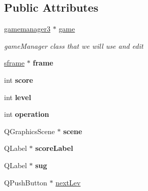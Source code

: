 \subsection*{\-Public \-Attributes}
\begin{DoxyCompactItemize}
\item 
\hypertarget{classnextwindow_a5781f299818d0b3fb7ec64cf98833f51}{\hyperlink{classgamemanager3}{gamemanager3} $\ast$ \hyperlink{classnextwindow_a5781f299818d0b3fb7ec64cf98833f51}{game}}\label{classnextwindow_a5781f299818d0b3fb7ec64cf98833f51}

\begin{DoxyCompactList}\small\item\em game\-Manager class that we will use and edit \end{DoxyCompactList}\item 
\hypertarget{classnextwindow_ad00acc8e6304a93f025ed6e820af23b3}{\hyperlink{classsframe}{sframe} $\ast$ {\bfseries frame}}\label{classnextwindow_ad00acc8e6304a93f025ed6e820af23b3}

\item 
\hypertarget{classnextwindow_a489f749224efac4e971e6a8840b73e66}{int {\bfseries score}}\label{classnextwindow_a489f749224efac4e971e6a8840b73e66}

\item 
\hypertarget{classnextwindow_a90b3d218995df6f53f4a3a87f394f773}{int {\bfseries level}}\label{classnextwindow_a90b3d218995df6f53f4a3a87f394f773}

\item 
\hypertarget{classnextwindow_a43a38e9efad9efea3807f5635477dabf}{int {\bfseries operation}}\label{classnextwindow_a43a38e9efad9efea3807f5635477dabf}

\item 
\hypertarget{classnextwindow_a9378c617d7634b20a383dde734795393}{\-Q\-Graphics\-Scene $\ast$ {\bfseries scene}}\label{classnextwindow_a9378c617d7634b20a383dde734795393}

\item 
\hypertarget{classnextwindow_a3e96c75a5d328a62952741c50c5b64b4}{\-Q\-Label $\ast$ {\bfseries score\-Label}}\label{classnextwindow_a3e96c75a5d328a62952741c50c5b64b4}

\item 
\hypertarget{classnextwindow_ad7dbc38f268257a4d93f3eaee119c6d2}{\-Q\-Label $\ast$ {\bfseries sug}}\label{classnextwindow_ad7dbc38f268257a4d93f3eaee119c6d2}

\item 
\hypertarget{classnextwindow_a9c340450d9b687d23ba8f410ff38a31f}{\-Q\-Push\-Button $\ast$ \hyperlink{classnextwindow_a9c340450d9b687d23ba8f410ff38a31f}{next\-Lev}}\label{classnextwindow_a9c340450d9b687d23ba8f410ff38a31f}


\end{DoxyCompactItemize}
